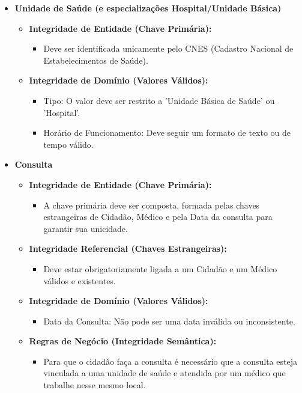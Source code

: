 \documentclass[12pt, a4paper]{article}
\begin{document}
\begin{itemize}
    \item \textbf{Unidade de Saúde (e especializações Hospital/Unidade Básica)}
    \begin{itemize}
        \item \textbf{Integridade de Entidade (Chave Primária):}
        \begin{itemize}
            \item Deve ser identificada unicamente pelo CNES (Cadastro Nacional de Estabelecimentos de Saúde).
        \end{itemize}
        \item \textbf{Integridade de Domínio (Valores Válidos):}
        \begin{itemize}
            \item Tipo: O valor deve ser restrito a 'Unidade Básica de Saúde' ou 'Hospital'.
            \item Horário de Funcionamento: Deve seguir um formato de texto ou de tempo válido.
        \end{itemize}
    \end{itemize}

    \item \textbf{Consulta}
    \begin{itemize}
        \item \textbf{Integridade de Entidade (Chave Primária):}
        \begin{itemize}
            \item A chave primária deve ser composta, formada pelas chaves estrangeiras de Cidadão, Médico e pela Data da consulta para garantir sua unicidade.
        \end{itemize}
        \item \textbf{Integridade Referencial (Chaves Estrangeiras):}
        \begin{itemize}
            \item Deve estar obrigatoriamente ligada a um Cidadão e um Médico válidos e existentes.
        \end{itemize}
        \item \textbf{Integridade de Domínio (Valores Válidos):}
        \begin{itemize}
            \item Data da Consulta: Não pode ser uma data inválida ou inconsistente.
        \end{itemize}
        \item \textbf{Regras de Negócio (Integridade Semântica):}
        \begin{itemize}
            \item Para que o cidadão faça a consulta é necessário que a consulta esteja vinculada a uma unidade de saúde e atendida por um médico que trabalhe nesse mesmo local.
        \end{itemize}
    \end{itemize}


\end{itemize}
\end{document}

